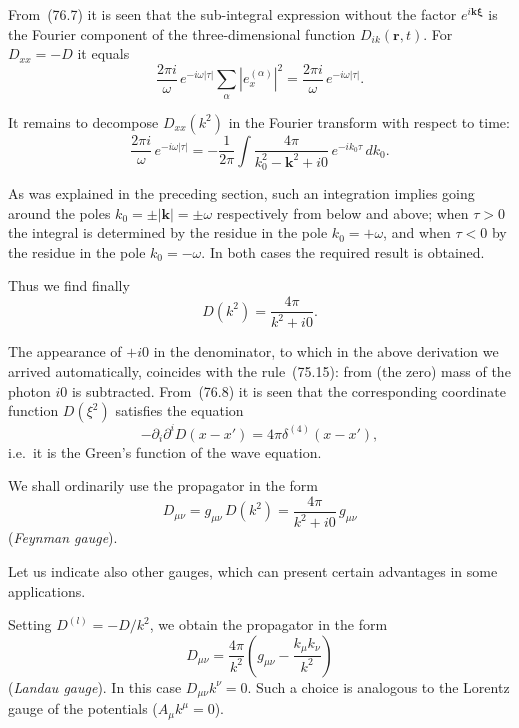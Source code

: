 From~(76.7) it is seen that the sub-integral expression without the factor $e^{i\mathbf{k}\boldsymbol{\xi}}$ is the Fourier component of the three-dimensional function $D_{ik}(\mathbf{r},t)$. For $D_{xx} = -D$ it equals
\[
\frac{2\pi i}{\omega}\,e^{-i\omega|\tau|}\sum_\alpha|e_x^{(\alpha)}|^2 = \frac{2\pi i}{\omega}\,e^{-i\omega|\tau|}.
\]

It remains to decompose $D_{xx}(k^2)$ in the Fourier transform with respect to time:
\[
\frac{2\pi i}{\omega}\,e^{-i\omega|\tau|} = -\frac{1}{2\pi}\int\frac{4\pi}{k_0^2 - \mathbf{k}^2 + i0}\,e^{-ik_0\tau}\,dk_0.
\]

As was explained in the preceding section, such an integration implies going around the poles $k_0 = \pm|\mathbf{k}| = \pm\omega$ respectively from below and above; when $\tau > 0$ the integral is determined by the residue in the pole $k_0 = +\omega$, and when $\tau < 0$ by the residue in the pole $k_0 = -\omega$. In both cases the required result is obtained.

Thus we find finally
\begin{equation}
D(k^2) = \frac{4\pi}{k^2 + i0}.
\tag{76.8}
\end{equation}

The appearance of $+i0$ in the denominator, to which in the above derivation we arrived automatically, coincides with the rule~(75.15): from (the zero) mass of the photon $i0$ is subtracted. From~(76.8) it is seen that the corresponding coordinate function $D(\xi^2)$ satisfies the equation
\begin{equation}
-\partial_i\partial^i D(x - x') = 4\pi\delta^{(4)}(x - x'),
\tag{76.9}
\end{equation}
i.e.\ it is the Green's function of the wave equation.

We shall ordinarily use the propagator in the form
\begin{equation}
D_{\mu\nu} = g_{\mu\nu}\,D(k^2) = \frac{4\pi}{k^2 + i0}\,g_{\mu\nu}
\tag{76.10}
\end{equation}
(\textit{Feynman gauge}).

Let us indicate also other gauges, which can present certain advantages in some applications.

Setting $D^{(l)} = -D/k^2$, we obtain the propagator in the form
\begin{equation}
D_{\mu\nu} = \frac{4\pi}{k^2}\left(g_{\mu\nu} - \frac{k_\mu k_\nu}{k^2}\right)
\tag{76.11}
\end{equation}
(\textit{Landau gauge}). In this case $D_{\mu\nu}k^\nu = 0$. Such a choice is analogous to the Lorentz gauge of the potentials ($A_\mu k^\mu = 0$).

